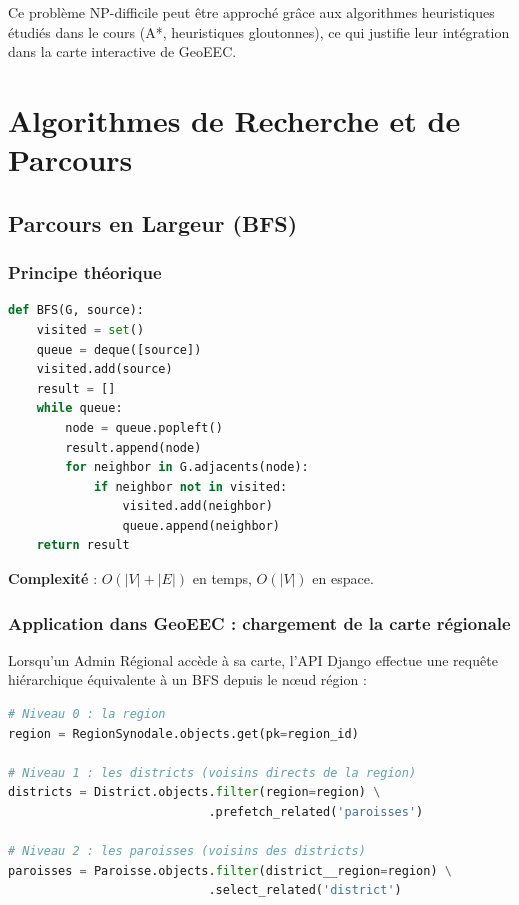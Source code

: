 \documentclass[12pt, a4paper]{report}
\theoremstyle{definition}
\begin{document}
Ce problème NP-difficile peut être approché grâce aux algorithmes heuristiques étudiés dans le cours (A*, heuristiques gloutonnes), ce qui justifie leur intégration dans la carte interactive de GeoEEC.

\chapter{Algorithmes de Recherche et de Parcours}

\section{Parcours en Largeur (BFS)}

\subsection{Principe théorique}

\begin{tcolorbox}[algobox, title=Algorithme BFS (Breadth-First Search)]
\begin{lstlisting}[language=Python, numbers=none]
def BFS(G, source):
    visited = set()
    queue = deque([source])
    visited.add(source)
    result = []
    while queue:
        node = queue.popleft()
        result.append(node)
        for neighbor in G.adjacents(node):
            if neighbor not in visited:
                visited.add(neighbor)
                queue.append(neighbor)
    return result
\end{lstlisting}
\end{tcolorbox}

\textbf{Complexité} : $O(|V| + |E|)$ en temps, $O(|V|)$ en espace.

\subsection{Application dans GeoEEC : chargement de la carte régionale}

Lorsqu'un Admin Régional accède à sa carte, l'API Django effectue une requête hiérarchique équivalente à un BFS depuis le nœud région :

\begin{lstlisting}[language=Python, caption=Requête BFS implicite dans geo/views.py]
# Niveau 0 : la region
region = RegionSynodale.objects.get(pk=region_id)

# Niveau 1 : les districts (voisins directs de la region)
districts = District.objects.filter(region=region) \
                            .prefetch_related('paroisses')

# Niveau 2 : les paroisses (voisins des districts)
paroisses = Paroisse.objects.filter(district__region=region) \
                            .select_related('district')
\end{lstlisting}
\end{document}
